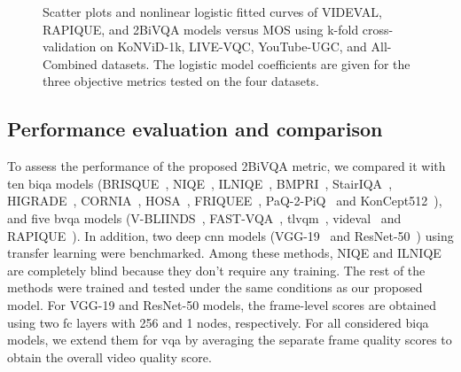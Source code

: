 \documentclass[journal]{IEEEtran}
\begin{document}
\begin{figure*}[!t]
\hfil
{}
\hfil
{}
\hfil
\caption{Scatter plots and nonlinear logistic fitted curves of VIDEVAL, RAPIQUE, and 2BiVQA models versus MOS  using k-fold cross-validation on KoNViD-1k, LIVE-VQC, YouTube-UGC, and All-Combined datasets. The logistic model coefficients are given for the three objective metrics tested on the four datasets.}
\label{scatter}
\end{figure*}
\begin{table}[]
\centering
\caption{Comparison of 2BiVQA and FAST-VQA characteristics during training.}
\label{com}
\end{table}
 \subsection{Performance evaluation and comparison} \label{Main Evaluation Results}
To assess the performance of the proposed 2BiVQA metric, we compared it with ten \ac{biqa} models (BRISQUE~\cite{mittal2012no}, NIQE~\cite{mittal2012making}, ILNIQE~\cite{zhang2015feature}, BMPRI~\cite{min2018blind}, StairIQA~\cite{sun2023blind},  HIGRADE~\cite{kundu2017no}, CORNIA~\cite{ye2012unsupervised},  HOSA~\cite{xu2016blind},  FRIQUEE~\cite{ghadiyaram2017perceptual}, PaQ-2-PiQ~\cite{ying2020patches} and KonCept512~\cite{hosu2020koniq}), and five \ac{bvqa} models (V-BLIINDS~\cite{saad2014blind}, FAST-VQA~\cite{wu2022fast}, \ac{tlvqm}~\cite{korhonen2019two}, \ac{videval}~\cite{tu2021ugc} and RAPIQUE~\cite{tu2021rapique}). In addition, two deep \ac{cnn} models (VGG-19~\cite{simonyan2014very} and ResNet-50~\cite{he2016deep}) using transfer learning were benchmarked. Among these methods, NIQE and ILNIQE  are completely blind because they don't require any training. The rest of the methods were trained and tested under the same conditions as our proposed model. For  VGG-19 and ResNet-50 models, the frame-level scores are obtained using two \ac{fc} layers with 256 and 1 nodes, respectively. For all considered \ac{biqa} models, we extend them for \ac{vqa} by averaging the separate frame quality scores to obtain the overall video quality score.
\end{document}
